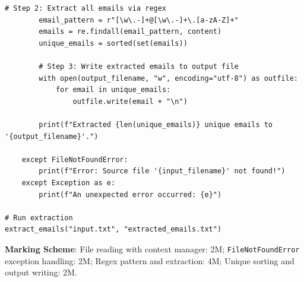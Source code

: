 \begin{solutionbox}
\begin{enumerate}[start=7]
\begin{lstlisting}[language=Python3]
        # Step 2: Extract all emails via regex
        email_pattern = r"[\w\.-]+@[\w\.-]+\.[a-zA-Z]+"
        emails = re.findall(email_pattern, content)
        unique_emails = sorted(set(emails))
        
        # Step 3: Write extracted emails to output file
        with open(output_filename, "w", encoding="utf-8") as outfile:
            for email in unique_emails:
                outfile.write(email + "\n")
                
        print(f"Extracted {len(unique_emails)} unique emails to '{output_filename}'.")
        
    except FileNotFoundError:
        print(f"Error: Source file '{input_filename}' not found!")
    except Exception as e:
        print(f"An unexpected error occurred: {e}")

# Run extraction
extract_emails("input.txt", "extracted_emails.txt")
\end{lstlisting}
\textbf{Marking Scheme}: File reading with context manager: 2M; \texttt{FileNotFoundError} exception handling: 2M; Regex pattern and extraction: 4M; Unique sorting and output writing: 2M.
\end{enumerate}
\end{solutionbox}
